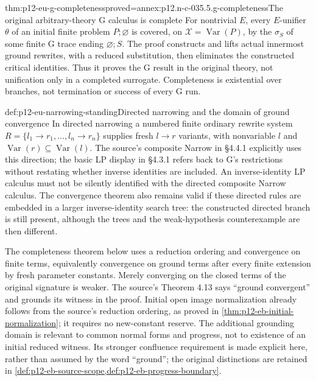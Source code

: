 \begin{hbtheorem}{thm:p12-eu-g-completeness}{proved=annex:p12.n-c-035.5.g-completeness}{The original arbitrary-theory G calculus is complete}
For nontrivial \(E\), every \(E\)-unifier \(\theta\) of an
initial finite problem \(P;\varnothing\) is covered, on
\(\mathcal X=\operatorname{Var}(P)\), by the \(\sigma_S\) of
some finite G trace ending \(\varnothing;S\).
The proof constructs and lifts actual innermost ground rewrites,
with a reduced substitution, then eliminates the constructed critical
identities. Thus it proves the G result in the original theory, not
unification only in a completed surrogate. Completeness is existential
over branches, not termination or success of every G run.
\cite[Theorem 4.2, pp.~489--494]{BaaderSnyder2001}
\end{hbtheorem}

\begin{hbdefinition}{def:p12-eu-narrowing-standing}{Directed narrowing and the domain of ground convergence}
In directed narrowing a numbered finite ordinary rewrite system
\(R=\{l_1\to r_1,\ldots,l_n\to r_n\}\) supplies fresh
\(l\to r\) variants, with nonvariable \(l\) and
\(\operatorname{Var}(r)\subseteq\operatorname{Var}(l)\).
The source's composite Narrow in \S4.4.1 explicitly uses this direction;
the basic LP display in \S4.3.1 refers back to G's restrictions without
restating whether inverse identities are included. An inverse-identity
LP calculus must not be silently identified with the directed composite
Narrow calculus. The convergence theorem also remains valid if these
directed rules are embedded in a larger inverse-identity search tree:
the constructed directed branch is still present, although the trees
and the weak-hypothesis counterexample are then different.

The completeness theorem below uses a reduction ordering and convergence
on finite terms, equivalently convergence on ground terms after every
finite extension by fresh parameter constants. Merely converging on
the closed terms of the original signature is weaker. The source's
Theorem 4.13 says ``ground convergent'' and grounds its witness in
the proof. Initial open image normalization already follows from
the source's reduction ordering, as proved in
\cref{thm:p12-eb-initial-normalization}; it requires no new-constant
reserve. The additional grounding domain is relevant to common
normal forms and progress, not to existence of an initial reduced
witness. Its stronger confluence requirement is made explicit here,
rather than assumed by the word ``ground''; the original distinctions
are retained in \cref{def:p12-eb-source-scope,def:p12-eb-progress-boundary}.
\cite[\S4.3 and Theorems 4.13--4.14, pp.~496--499]{BaaderSnyder2001}
\end{hbdefinition}

